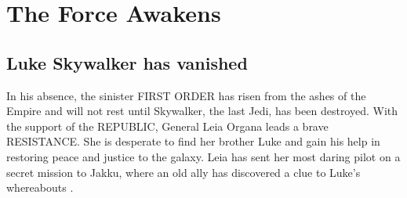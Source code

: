 \chapter{The Force Awakens}
\section{Luke Skywalker has vanished}
In his absence, the sinister FIRST ORDER has risen from the 
ashes of the Empire and will not rest until Skywalker, the 
last Jedi, has been destroyed. With the support of the 
REPUBLIC, General Leia Organa leads a brave RESISTANCE. She 
is desperate to find her brother Luke and gain his help in 
restoring peace and justice to the galaxy. Leia has sent her 
most daring pilot on a secret mission to Jakku, where an old 
ally has discovered a clue to Luke's whereabouts \cite{bib_snoke15}.

\lipsum[1-10]
